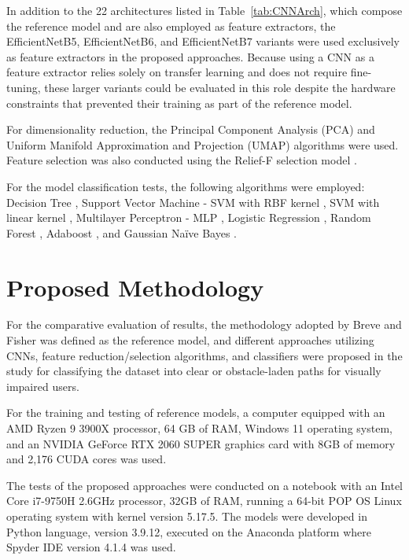 \documentclass[preprint,12pt]{elsarticle}
\begin{document}
In addition to the 22 architectures listed in Table~\ref{tab:CNNArch}, which compose the reference model and are also employed as feature extractors, the EfficientNetB5, EfficientNetB6, and EfficientNetB7 variants \cite{tan2019} were used exclusively as feature extractors in the proposed approaches. Because using a CNN as a feature extractor relies solely on transfer learning and does not require fine-tuning, these larger variants could be evaluated in this role despite the hardware constraints that prevented their training as part of the reference model.

For dimensionality reduction, the Principal Component Analysis (PCA) \cite{jolliffe2002} and Uniform Manifold Approximation and Projection (UMAP) \cite{mcinnes2021} algorithms were used. Feature selection was also conducted using the Relief-F selection model \cite{kononenko1994}.

For the model classification tests, the following algorithms were employed: Decision Tree \cite{priyanka2020}, Support Vector Machine - SVM with RBF kernel \cite{liu2011}, SVM with linear kernel \cite{lorena2003}, Multilayer Perceptron - MLP \cite{pereira2013}, Logistic Regression \cite{ekstrom2018}, Random Forest \cite{breiman2001}, Adaboost \cite{zhu2009}, and Gaussian Naïve Bayes \cite{gayathri2016}.

\section{Proposed Methodology}

For the comparative evaluation of results, the methodology adopted by Breve and Fisher \cite{breve2020} was defined as the reference model, and different approaches utilizing CNNs, feature reduction/selection algorithms, and classifiers were proposed in the study for classifying the dataset into clear or obstacle-laden paths for visually impaired users.

For the training and testing of reference models, a computer equipped with an AMD Ryzen 9 3900X processor, 64 GB of RAM, Windows 11 operating system, and an NVIDIA GeForce RTX 2060 SUPER graphics card with 8GB of memory and 2,176 CUDA cores was used.

The tests of the proposed approaches were conducted on a notebook with an Intel Core i7-9750H 2.6GHz processor, 32GB of RAM, running a 64-bit POP OS Linux operating system with kernel version 5.17.5. The models were developed in Python language, version 3.9.12, executed on the Anaconda platform where Spyder IDE version 4.1.4 was used.
\end{document}
